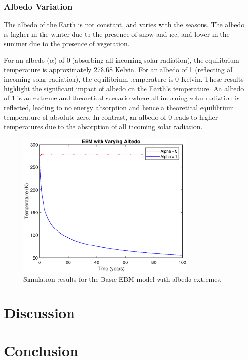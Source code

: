 \documentclass[12pt]{article}
\begin{document}
\subsubsection{Albedo Variation}
The albedo of the Earth is not constant, 
and varies with the seasons. 
The albedo is higher in the winter due to the presence of snow and ice, 
and lower in the summer due to the presence of vegetation. 

For an albedo ($\alpha$) of 0 (absorbing all incoming solar radiation), 
the equilibrium temperature is approximately 278.68 Kelvin.
For an albedo of 1 (reflecting all incoming solar radiation), 
the equilibrium temperature is 0 Kelvin.
These results highlight the significant impact of albedo on the Earth's temperature. 
An albedo of 1 is an extreme and theoretical scenario 
where all incoming solar radiation is reflected, 
leading to no energy absorption 
and hence a theoretical equilibrium temperature of absolute zero. 
In contrast, an albedo of 0 leads to higher temperatures 
due to the absorption of all incoming solar radiation. 

\begin{figure}[ht]
\centering
\includegraphics[width=0.8\textwidth]{albedo_extremes.eps}
\caption{Simulation results for the Basic EBM model with albedo extremes.}
\label{fig:albedoExtremes}
\end{figure}

\section{Discussion}

\section{Conclusion}
\end{document}

